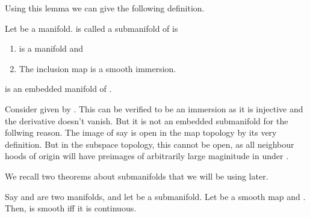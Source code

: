 \documentclass{article}
\begin{document}
Using this lemma we can give the following definition.

\begin{definition}
    Let  be a manifold.  is called a submanifold of  is 
    \begin{enumerate}
        \item {} is a manifold and 
        \item The inclusion map is a smooth immersion.
    \end{enumerate}
\end{definition}

\begin{example}
    \mm{\RR} is an embedded manifold of .
\end{example}
\begin{example}
    Consider  given by . This can be verified to be an immersion as it is injective and the derivative doesn't vanish.
    But it is not an embedded submanifold for the follwing reason. The image of say  is open in the map topology by its very definition.
    But in the subspace topology, this cannot be open, as all neighbour hoods of origin will have preimages of arbitrarily large maginitude in \mm{\RR} under \mm{\phi}.
\end{example}


We recall two theorems about submanifolds that we will be using later.

\begin{theorem}
    Say  and  are two manifolds, and let  be a submanifold. Let 
     be a smooth map and . Then,  is smooth iff it is continuous.
\end{theorem}
\end{document}
